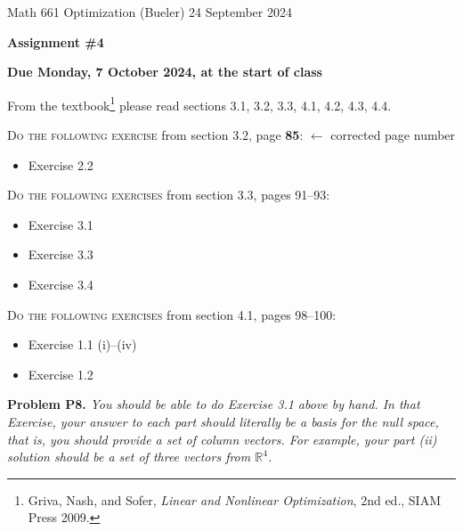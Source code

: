 \documentclass[12pt]{amsart}
\newcommand{\RR}{\mathbb{R}}
\newcommand{\prob}[1]{\bigskip\noindent\textbf{#1}\quad }
\begin{document}
\scriptsize \noindent Math 661 Optimization (Bueler) \hfill 24 September 2024
\normalsize

\medskip\bigskip

\Large\centerline{\textbf{Assignment \#4}}
\large
\bigskip

\centerline{\textbf{Due Monday, 7 October 2024, at the start of class}}
\bigskip
\normalsize

\thispagestyle{empty}

\bigskip
\noindent From the textbook\footnote{Griva, Nash, and Sofer, \emph{Linear and Nonlinear Optimization}, 2nd ed., SIAM Press 2009.} please read sections 3.1, 3.2, 3.3, 4.1, 4.2, 4.3, 4.4.

\bigskip
\noindent \textsc{Do the following exercise} from section 3.2, page {\color{BrickRed}\textbf{85}}: \hfill {\color{BrickRed} $\leftarrow$ corrected page number}

\begin{itemize}
\item Exercise 2.2
\end{itemize}

\bigskip
\noindent \textsc{Do the following exercises} from section 3.3, pages 91--93:

\begin{itemize}
\item Exercise 3.1
\item Exercise 3.3
\item Exercise 3.4
\end{itemize}

\bigskip
\noindent \textsc{Do the following exercises} from section 4.1, pages 98--100:

\begin{itemize}
\item Exercise 1.1 (i)--(iv)
\item Exercise 1.2
\end{itemize}

\prob{Problem P8.}  \emph{You should be able to do Exercise 3.1 above by hand.   In that Exercise, your answer to each part should literally be a \emph{basis} for the null space, that is, you should provide a set of column vectors.  For example, your part (ii) solution should be a set of three vectors from $\RR^4$.}
\end{document}
